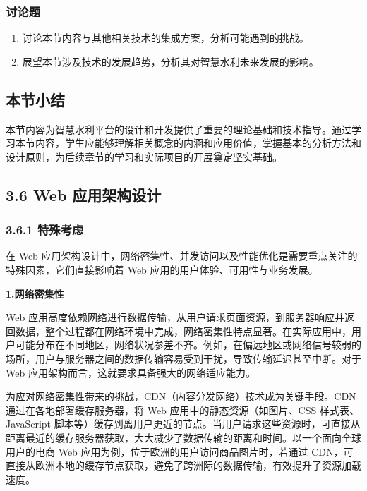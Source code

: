 \subsubsection{讨论题}\label{ux8ba8ux8bbaux9898-1}

\begin{enumerate}
\def\labelenumi{\arabic{enumi}.}
\setcounter{enumi}{6}
\tightlist
\item
  讨论本节内容与其他相关技术的集成方案，分析可能遇到的挑战。
\item
  展望本节涉及技术的发展趋势，分析其对智慧水利未来发展的影响。
\end{enumerate}

\subsection{本节小结}\label{ux672cux8282ux5c0fux7ed3-1}

本节内容为智慧水利平台的设计和开发提供了重要的理论基础和技术指导。通过学习本节内容，学生应能够理解相关概念的内涵和应用价值，掌握基本的分析方法和设计原则，为后续章节的学习和实际项目的开展奠定坚实基础。

\subsection{3.6 Web 应用架构设计}\label{web-ux5e94ux7528ux67b6ux6784ux8bbeux8ba1}

\subsubsection{3.6.1 特殊考虑}\label{ux7279ux6b8aux8003ux8651}

在 Web 应用架构设计中，网络密集性、并发访问以及性能优化是需要重点关注的特殊因素，它们直接影响着 Web 应用的用户体验、可用性与业务发展。

\textbf{1.网络密集性}

Web 应用高度依赖网络进行数据传输，从用户请求页面资源，到服务器响应并返回数据，整个过程都在网络环境中完成，网络密集性特点显著。在实际应用中，用户可能分布在不同地区，网络状况参差不齐。例如，在偏远地区或网络信号较弱的场所，用户与服务器之间的数据传输容易受到干扰，导致传输延迟甚至中断。对于 Web 应用架构而言，这就要求具备强大的网络适应能力。

为应对网络密集性带来的挑战，CDN（内容分发网络）技术成为关键手段。CDN 通过在各地部署缓存服务器，将 Web 应用中的静态资源（如图片、CSS 样式表、JavaScript 脚本等）缓存到离用户更近的节点。当用户请求这些资源时，可直接从距离最近的缓存服务器获取，大大减少了数据传输的距离和时间。以一个面向全球用户的电商 Web 应用为例，位于欧洲的用户访问商品图片时，若通过 CDN，可直接从欧洲本地的缓存节点获取，避免了跨洲际的数据传输，有效提升了资源加载速度。

